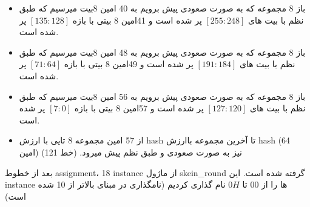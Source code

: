 \begin{itemize}
	\item
	      باز 8 مجموعه که به صورت صعودی پیش برویم به 40 امین 8بیت میرسیم که طبق نظم با بیت های $[255:248]$ پر شده است و 41امین 8 بیتی با بازه $[135:128]$ پر شده است.
	\item
	      باز 8 مجموعه که به صورت صعودی پیش برویم به 48 امین 8بیت میرسیم که طبق نظم با بیت های $[191:184]$ پر شده است و 49امین 8 بیتی با بازه $[71:64]$ پر شده است.
	\item
	      باز 8 مجموعه که به صورت صعودی پیش برویم به 56 امین 8بیت میرسیم که طبق نظم با بیت های $[127:120]$ پر شده است و 57امین 8 بیتی با بازه $[7:0]$ پر شده است.
	\item
	      از 57 امین مجموعه 8 تایی با ارزش hash تا آخرین مجموعه باارزش hash (64 امین) نیز به صورت صعودی و طبق نظم پیش میرود. (خط 121)
	      
\end{itemize}

بعد از خطوط assignment، 18 instance از ماژول skein\_round گرفته شده است.
این instance ها را از 
$00$
تا
$0H$
نام گذاری کردیم (نامگذاری در مبنای بالاتر از 10 شده است)

